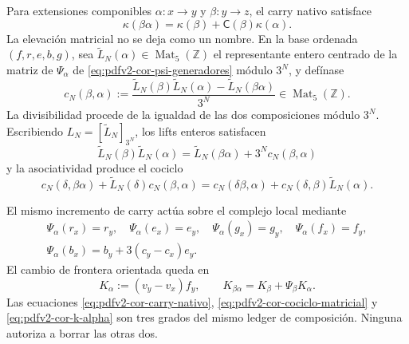 Para extensiones componibles \(\alpha:x\to y\) y \(\beta:y\to z\), el
carry nativo satisface
\begin{equation}
\label{eq:pdfv2-cor-carry-nativo}
 \kappa(\beta\alpha)=
 \kappa(\beta)+\mathsf C(\beta)\kappa(\alpha).
\end{equation}
La elevación matricial no se deja como un nombre. En la base ordenada
\((f,r,e,b,g)\), sea
\(\widetilde L_N(\alpha)\in\operatorname{Mat}_5(\mathbb Z)\) el
representante entero centrado de la matriz de
\(\Psi_\alpha\) de \eqref{eq:pdfv2-cor-psi-generadores} módulo \(3^N\), y
defínase
\begin{equation}
\label{eq:pdfv2-cor-carry-matricial-def}
 c_N(\beta,\alpha):=
 \frac{\widetilde L_N(\beta)\widetilde L_N(\alpha)
       -\widetilde L_N(\beta\alpha)}{3^N}
 \in\operatorname{Mat}_5(\mathbb Z).
\end{equation}
La divisibilidad procede de la igualdad de las dos composiciones módulo
\(3^N\). Escribiendo \(L_N=[\widetilde L_N]_{3^N}\), los lifts enteros
satisfacen
\begin{equation}
\label{eq:pdfv2-cor-carry-matricial}
 \widetilde L_N(\beta)\widetilde L_N(\alpha)
 =\widetilde L_N(\beta\alpha)+3^Nc_N(\beta,\alpha)
\end{equation}
y la asociatividad produce el cociclo
\begin{equation}
\label{eq:pdfv2-cor-cociclo-matricial}
 c_N(\delta,\beta\alpha)+\widetilde L_N(\delta)c_N(\beta,\alpha)
 =c_N(\delta\beta,\alpha)
  +c_N(\delta,\beta)\widetilde L_N(\alpha).
\end{equation}

El mismo incremento de carry actúa sobre el complejo local mediante
\begin{equation}
\label{eq:pdfv2-cor-psi-generadores}
 \begin{gathered}
 \Psi_\alpha(r_x)=r_y,\quad
 \Psi_\alpha(e_x)=e_y,\quad
 \Psi_\alpha(g_x)=g_y,\quad
 \Psi_\alpha(f_x)=f_y,\\
 \Psi_\alpha(b_x)=b_y+3(c_y-c_x)e_y.
 \end{gathered}
\end{equation}
El cambio de frontera orientada queda en
\begin{equation}
\label{eq:pdfv2-cor-k-alpha}
 K_\alpha:=(v_y-v_x)f_y,
 \qquad
 K_{\beta\alpha}=K_\beta+\Psi_\beta K_\alpha.
\end{equation}
Las ecuaciones \eqref{eq:pdfv2-cor-carry-nativo},
\eqref{eq:pdfv2-cor-cociclo-matricial} y
\eqref{eq:pdfv2-cor-k-alpha} son tres grados del mismo ledger de composición.
Ninguna autoriza a borrar las otras dos.

